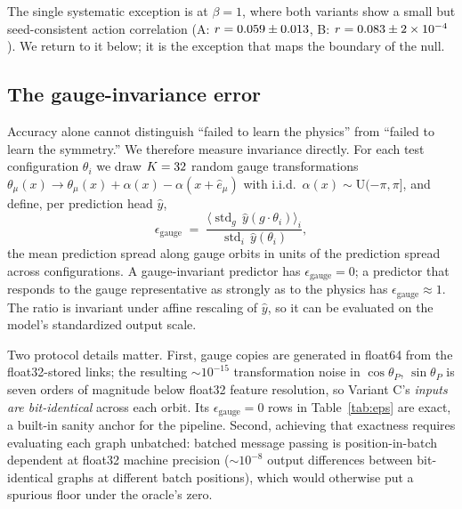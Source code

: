 \documentclass[aps,prd,twocolumn,superscriptaddress,nofootinbib]{revtex4-2}
\newcommand{\epsg}{\ensuremath{\epsilon_{\text{gauge}}}}
\newcommand{\thetaP}{\ensuremath{\theta_P}}
\begin{document}
The single systematic exception is at $\beta = 1$, where both variants
show a small but seed-consistent action correlation
(A: $r = 0.059 \pm 0.013$, B: $r = 0.083 \pm 2 \times 10^{-4}$). We return
to it below; it is the exception that maps the boundary of the null.

\subsection{The gauge-invariance error}
\label{sec:eps}

Accuracy alone cannot distinguish ``failed to learn the physics'' from
``failed to learn the symmetry.'' We therefore measure invariance
directly. For each test configuration $\theta_i$ we draw $K=\numKCopies$
random gauge transformations
$\theta_\mu(x) \to \theta_\mu(x) + \alpha(x) - \alpha(x{+}\hat e_\mu)$
with i.i.d.\ $\alpha(x) \sim \mathrm{U}(-\pi,\pi]$, and define, per
prediction head $\hat y$,
\begin{equation}
\epsg \;=\;
\frac{\bigl\langle \operatorname{std}_{g}\,
      \hat y(g \cdot \theta_i) \bigr\rangle_i}
     {\operatorname{std}_i\, \hat y(\theta_i)},
\label{eq:eps}
\end{equation}
the mean prediction spread along gauge orbits in units of the prediction
spread across configurations. A gauge-invariant predictor has
$\epsg = 0$; a predictor that responds to the gauge representative as
strongly as to the physics has $\epsg \approx 1$. The ratio is invariant
under affine rescaling of $\hat y$, so it can be evaluated on the
model's standardized output scale.

Two protocol details matter. First, gauge copies are generated in
float64 from the float32-stored links; the resulting
$\sim\!10^{-15}$ transformation noise in $\cos\thetaP$, $\sin\thetaP$ is
seven orders of magnitude below float32 feature resolution, so Variant
C's \emph{inputs are bit-identical} across each orbit. Its $\epsg = 0$
rows in Table~\ref{tab:eps} are exact, a built-in sanity anchor for the
pipeline. Second, achieving that exactness requires evaluating each
graph unbatched: batched message passing is position-in-batch dependent
at float32 machine precision ($\sim\!10^{-8}$ output differences between
bit-identical graphs at different batch positions), which would
otherwise put a spurious floor under the oracle's zero.

\begin{table}[t]
\caption{Gauge-invariance error \epsg{} [Eq.~\eqref{eq:eps}, $K=\numKCopies$
gauge copies per test configuration] by target: total action $S$, Wilson
loops, topological charge $Q$. Mean $\pm$ std over seeds. Variant C's
zeros are exact (bit-identical inputs; see text). Across all
\numNumEpsRows{} measured cells---including parameter-matched budgets,
escape hatches, and every augmentation arm---A and B lie in
$\epsg \in [\numEpsABMin, \numEpsABMax]$.}
\label{tab:eps}
\centering

\end{table}
\end{document}
